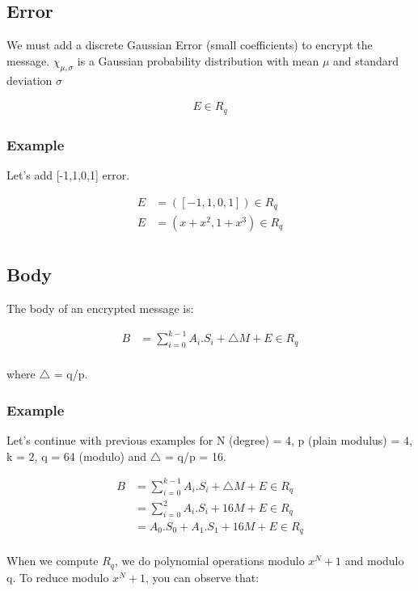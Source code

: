 \documentclass{techrep}
\theoremstyle{definition}
\theoremstyle{plain}
\begin{document}
	\subsection{Error}
We must add a discrete Gaussian Error (small coefficients) to encrypt the message.
$\chi_{\mu,\sigma}$ is a Gaussian probability distribution with mean $\mu$ and standard deviation $\sigma$

	\begin{align*}
		E \in R_q
	\end{align*}

\subsubsection{Example}

Let's add [-1,1,0,1] error.

\begin{align*} 
    E &= ([-1,1,0,1]) \in R_q \\ 
    E &= (x + x^2,1+x^3) \in R_q \\ 
\end{align*}

	\subsection{Body}
The body of an encrypted message is:

	\begin{align*}
		B &= \sum_{i=0}^{k-1}A_i . S_i + \bigtriangleup M + E \in R_q  \\
	\end{align*}

where $\bigtriangleup$ = q/p.

\subsubsection{Example}
Let’s continue with previous examples for N (degree) = 4, p (plain modulus) = 4, k = 2, q = 64 (modulo) and $\bigtriangleup$ = q/p = 16.

	\begin{align*}
		B &= \sum_{i=0}^{k-1}A_i . S_i + \bigtriangleup M + E \in R_q  \\
             &= \sum_{i=0}^2A_i . S_i + 16M + E \in R_q  \\
             &= A_0.S_0 + A_1.S_1 + 16M + E \in R_q  \\
	\end{align*}


When we compute $R_q$, we do polynomial operations modulo $x^N + 1$ and modulo q. 
To reduce modulo $x^N + 1$, you can observe that:
\end{document}
